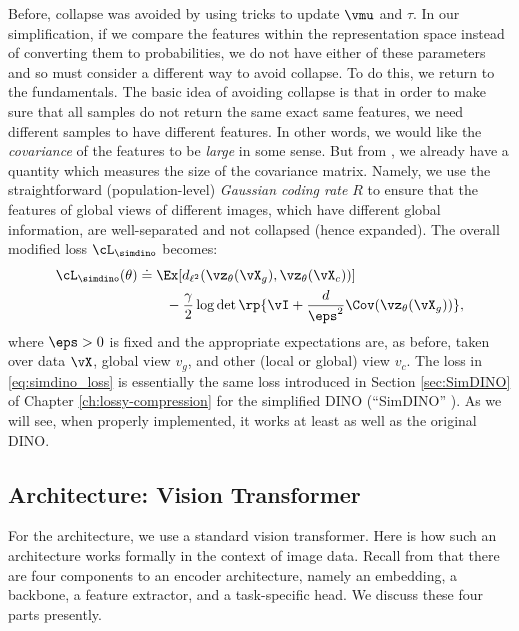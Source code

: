 \documentclass[../../book-main.tex]{subfiles}
\begin{document}
Before, collapse was avoided by using tricks to update \(\vmu\) and
\(\tau\). In our simplification, if we compare the features within
the representation space instead of converting them to probabilities,
we do not have either of these parameters and so must consider a
different way to avoid collapse. To do this, we return to the
fundamentals. The basic idea of avoiding collapse is that in order to
make sure that all samples do not return the same exact same
features, we need different samples to have different features. In
other words, we would like the \textit{covariance} of the features to
be \textit{large} in some sense. But from
, we already have a quantity
which measures the size of the covariance matrix. Namely, we use the
straightforward (population-level) \textit{Gaussian coding rate}
\(R\) to ensure that the features of global views of different
images, which have different global information, are well-separated
and not collapsed (hence expanded). The overall modified loss
\(\cL_{\simdino}\) becomes:
\begin{align}\label{eq:simdino_loss}
    \cL_{\simdino}(\theta) &\doteq \Ex[d_{\ell^{2}}(\vz_{\theta}(\vX_{g}),
    \vz_{\theta}(\vX_{c}))] \\
    &\qquad - \frac{\gamma}{2}\log\det\rp{\vI +
    \frac{d}{\eps^{2}}\Cov(\vz_{\theta}(\vX_{g}))},
\end{align}
where \(\eps > 0\) is fixed and the appropriate expectations are, as
before, taken over data \(\vX\), global view \(v_{g}\), and other
(local or global) view \(v_{c}\). The loss in \eqref{eq:simdino_loss}
is essentially the same loss introduced in Section \ref{sec:SimDINO}
of Chapter \ref{ch:lossy-compression} for the simplified DINO
(``SimDINO'' \cite{wu2025simplifying}). As we will see, when properly
implemented, it works at
least as well as the original DINO.

\subsection{Architecture: Vision
Transformer}\label{sub:contrastive_learning_architecture}

For the architecture, we use a standard vision transformer. Here is
how such an architecture works formally in the context of image data.
Recall from  that there are four
components to an encoder architecture, namely an embedding, a
backbone, a feature extractor, and a task-specific head. We discuss
these four parts presently.
\end{document}
